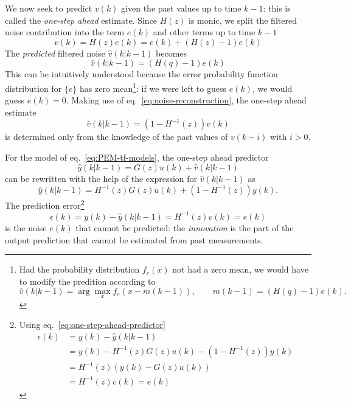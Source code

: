 We now seek to predict $v(k)$ given the past values up to time $k-1$: this is called the \emph{one-step ahead} estimate. Since $H(z)$ is monic, we split the filtered noise contribution into the term $e(k)$ and other terms up to time $k-1$
\begin{equation}
  \label{eq:prediction-split-filtered-noise}
  v(k) = H(z)e(k) = e(k) + (H(z)-1)e(k)
\end{equation}
The \emph{predicted} filtered noise $\hat{v}(k|k-1)$ becomes
\begin{equation*}
  \hat{v}(k|k-1) = (H(q)-1)e(k)
\end{equation*}
This can be intuitively understood because the error probability function distribution for $\{e\}$ has zero mean\footnote{Had the probability distribution $f_e(x)$ not had a zero mean, we would have to modify the predition according to
  \begin{equation*}
    \hat{v}(k|k-1) = \arg\max_x f_e(x - m(k-1)),\hspace{2em} m(k-1) = (H(q)-1)e(k).
  \end{equation*}}: if we were left to guess $e(k)$, we would guess $e(k)=0$. Making use of eq.~\eqref{eq:noise-reconstruction}, the one-step ahead estimate
\begin{equation}
  \label{eq:filtered-noise-one-step-prediction}
  \hat{v}(k|k-1) = \left(1-H^{-1}(z)\right)v(k)
\end{equation}
is determined only from the knowledge of the past values of $v(k-i)$ with $i>0$.

For the model of eq.~\eqref{eq:PEM-tf-models}, the one-step ahead predictor
\begin{equation*}
  \hat{y}(k|k-1) = G(z)u(k) + \hat{v}(k|k-1)
\end{equation*}
can be rewritten with the help of the expression for $\hat{v}(k|k-1)$ as
\begin{equation}
  \label{eq:one-step-ahead-predictor}
  \hat{y}(k|k-1) = H^{-1}(z)G(z)u(k) + \left(1-H^{-1}(z)\right) y(k).
\end{equation}
The prediction error\footnote{Using eq.~\eqref{eq:one-step-ahead-predictor}
\begin{align*}
  \epsilon(k) &= y(k) - \hat{y}(k|k-1) \\
              &= y(k) - H^{-1}(z)G(z)u(k) - \left(1-H^{-1}(z)\right) y(k) \\
              &= H^{-1}(z)(y(k) - G(z)u(k)) \\
              &= H^{-1}(z)v(k) = e(k)
\end{align*}}
\begin{equation}
  \label{eq:one-step-ahead-predictor-error}
  \epsilon(k) = y(k) - \hat{y}(k|k-1) = H^{-1}(z)v(k) = e(k)
\end{equation}
is the noise $e(k)$ that cannot be predicted: the \emph{innovation} is the part of the output prediction that cannot be estimated from past measurements.

